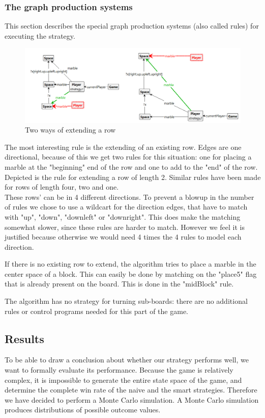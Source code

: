 \subsubsection{The graph production systems}
This section describes the special graph production systems (also called rules) for executing the strategy.

\begin{figure}[!h]
  \includegraphics[scale=0.42,clip]{Images/twocombined.png}
  \caption{Two ways of extending a row}
  \label{fig:twocombined}
\end{figure}

The most interesting rule is the extending of an existing row. Edges are one directional, because of this we get two rules for this situation: one for placing a marble at the "beginning" end of the row and one to add to the "end" of the row. Depicted is the rule for extending a row of length 2. Similar rules have been made for rows of length four, two and one.\\
These rows' can be in 4 different directions. To prevent a blowup in the number of rules we chose to use a wildcart for the direction edges, that have to match with "up", "down", "downleft" or "downright".
This does make the matching somewhat slower, since these rules are harder to match. However we feel it is justified because otherwise we would need 4 times the 4 rules to model each direction.

\vspace{6pt}

If there is no existing row to extend, the algorithm tries to place a marble in the center space of a block. This can easily be done by matching on the "place5" flag that is already present on the board. This is done in the "midBlock" rule.

\vspace{6pt}

The algorithm has no strategy for turning sub-boards: there are no additional rules or control programs needed for this part of the game.


\subsection{Results}
To be able to draw a conclusion about whether our strategy performs well, we want to formally evaluate its performance.
Because the game is relatively complex, it is impossible to generate the entire state space of the game, and determine the complete win rate of the naive and the smart strategies.
Therefore we have decided to perform a Monte Carlo simulation. A Monte Carlo simulation produces distributions of possible outcome values.

